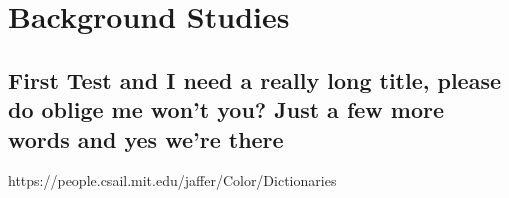 
\chapter{Background Studies}
\label{section:litreview}
\section{First Test and I need a really long title, please do oblige me won't you? Just a few more words and yes we're there}



https://people.csail.mit.edu/jaffer/Color/Dictionaries
